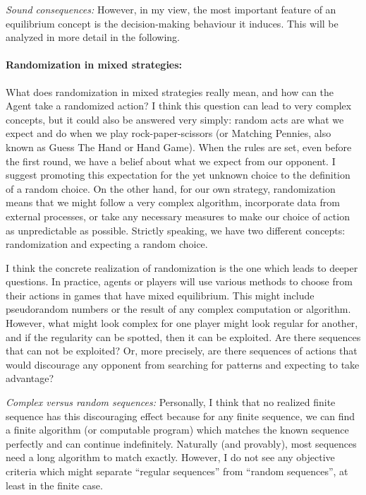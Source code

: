 \documentclass{article}
\begin{document}
{\it Sound consequences:}
However, in my view, the most important feature of an equilibrium concept is the decision-making behaviour it induces. This will be analyzed in more detail in the following.

\paragraph{Randomization in mixed strategies:}
What does randomization in mixed strategies really mean, and how can the Agent take a randomized action?
I think this question can lead to very complex concepts, but it could also be answered very simply: random acts are what we expect and do when we play rock-paper-scissors (or Matching Pennies, also known as Guess The Hand or Hand Game).
When the rules are set, even before the first round, we have a belief about what we expect from our opponent. I suggest promoting this expectation for the yet unknown choice to the definition of a random choice.
On the other hand, for our own strategy, randomization means that we might follow a very complex algorithm, incorporate data from external processes, or take any necessary measures to make our choice of action as unpredictable as possible.
Strictly speaking, we have two different concepts: randomization and expecting a random choice.

I think the concrete realization of randomization is the one which leads to deeper questions.
In practice, agents or players will use various methods to choose from their actions in games that have mixed equilibrium. This might include pseudorandom numbers or the result of any complex computation or algorithm. However, what might look complex for one player might look regular for another, and if the regularity can be spotted, then it can be exploited.
Are there sequences that can not be exploited? Or, more precisely, are there sequences of actions that would discourage any opponent from searching for patterns and expecting to take advantage?

{\it Complex versus random sequences:}
Personally, I think that no realized finite sequence has this discouraging effect because for any finite sequence, we can find a finite algorithm (or computable program) which matches the known sequence perfectly and can continue indefinitely. Naturally (and provably), most sequences need a long algorithm to match exactly. However, I do not see any objective criteria which might separate ``regular sequences'' from ``random sequences'', at least in the finite case.
\end{document}
